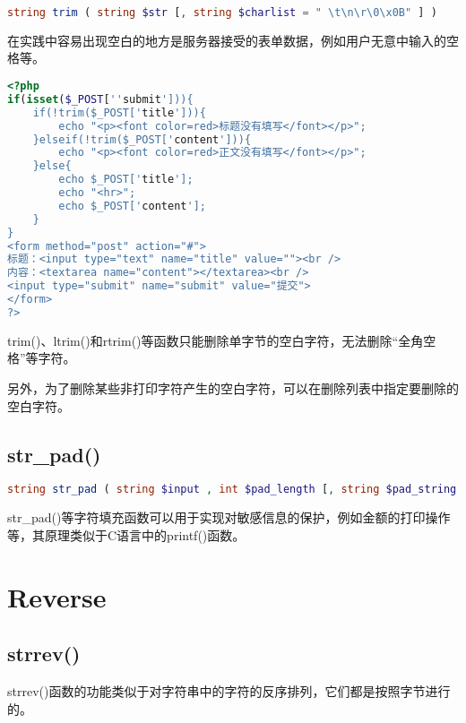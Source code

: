 \begin{lstlisting}[language=PHP]
string trim ( string $str [, string $charlist = " \t\n\r\0\x0B" ] )
\end{lstlisting}


在实践中容易出现空白的地方是服务器接受的表单数据，例如用户无意中输入的空格等。

\begin{lstlisting}[language=PHP]
<?php
if(isset($_POST[''submit'])){
	if(!trim($_POST['title'])){
		echo "<p><font color=red>标题没有填写</font></p>";
	}elseif(!trim($_POST['content'])){
		echo "<p><font color=red>正文没有填写</font></p>";
	}else{
		echo $_POST['title'];
		echo "<hr>";
		echo $_POST['content'];
	}
}
<form method="post" action="#">
标题：<input type="text" name="title" value=""><br />
内容：<textarea name="content"></textarea><br />
<input type="submit" name="submit" value="提交">
</form>
?>
\end{lstlisting}

trim()、ltrim()和rtrim()等函数只能删除单字节的空白字符，无法删除“全角空格”等字符。

另外，为了删除某些非打印字符产生的空白字符，可以在删除列表中指定要删除的空白字符。

\subsection{str\_pad()}





\begin{lstlisting}[language=PHP]
string str_pad ( string $input , int $pad_length [, string $pad_string = " " [, int $pad_type = STR_PAD_RIGHT ]] )
\end{lstlisting}

str\_pad()等字符填充函数可以用于实现对敏感信息的保护，例如金额的打印操作等，其原理类似于C语言中的printf()函数。

\section{Reverse}


\subsection{strrev()}



strrev()函数的功能类似于对字符串中的字符的反序排列，它们都是按照字节进行的。

